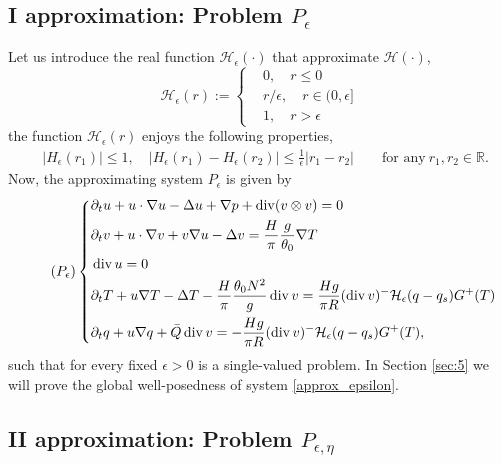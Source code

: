 \documentclass[11pt, a4paper, article,reqno,]{amsart}
\theoremstyle{remark}
\DeclareMathOperator{\dive}{div}
\numberwithin{equation}{section}
\begin{document}
\subsection*{I approximation: Problem $P_{\epsilon}$}
Let us introduce the real function $\mathcal{H}_\epsilon (\cdot)$ that approximate  $\mathcal{H}(\cdot)$,
\begin{equation}
\mathcal{H}_\epsilon (r) := \left \{ \begin{aligned}
             & 0, \quad r \leq 0 \\
            & r/\epsilon, \quad r \in (0, \epsilon] \\
            & 1, \quad r > \epsilon
        \end{aligned} \right.
\end{equation}
the function $\mathcal{H}_\epsilon(r)$ enjoys the following properties,
\begin{equation}\label{prop_H}
\begin{aligned}
        & |H_\epsilon(r_1)| \leq 1, \quad |H_\epsilon(r_1)-H_\epsilon(r_2)| \leq \frac{1}{\epsilon} |r_1-r_2| \qquad \text{for any}\  r_1,r_2 \in \mathbb{R}.
\end{aligned}
\end{equation}
Now, the approximating system $P_{\epsilon}$ is given by 
\begin{equation}\label{approx_epsilon}\tag{$P_{\epsilon}$}
\left\{\begin{aligned}
&\partial_t u + u \cdot \nabla u - \Delta u + \nabla p + \dive (v \otimes v) = 0\\
& \partial_ t v + u \cdot \nabla v + v \nabla u - \Delta v = \frac{H}{\pi} \frac{g}{\theta_0} \nabla T \\
& \dive u = 0 \\
& \partial_t T + u \nabla T - \Delta T - \frac{H}{\pi}\frac{\theta_0 N^2}{g}  \dive v = \frac{H g}{\pi R}(\dive v)^- \mathcal{H}_\epsilon(q-q_s) G^+(T) \\
& \partial_t q + u \nabla q + \bar{Q} \dive v = -  \frac{H g}{\pi R}(\dive v)^- \mathcal{H}_\epsilon(q-q_s) G^+(T), 
    \end{aligned}\right.
\end{equation}
such that for every fixed $\epsilon>0$ is a single-valued problem. In Section \ref{sec:5} we will prove the global well-posedness of system \eqref{approx_epsilon}. 

\subsection*{II approximation: Problem $P_{\epsilon,\eta}$}
\end{document}
